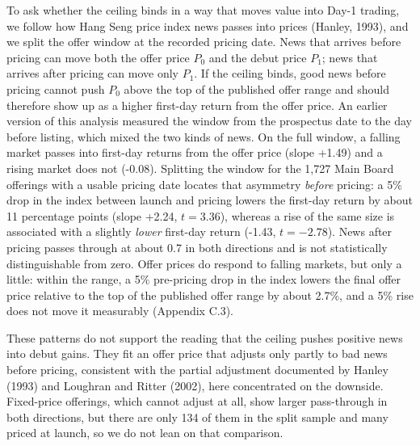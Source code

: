 \documentclass[11pt,letterpaper]{article}
\begin{document}
To ask whether the ceiling binds in a way that moves value into Day-1 trading, we follow how Hang Seng price index news passes into prices (Hanley, 1993), and we split the offer window at the recorded pricing date. News that arrives before pricing can move both the offer price $P_0$ and the debut price $P_1$; news that arrives after pricing can move only $P_1$. If the ceiling binds, good news before pricing cannot push $P_0$ above the top of the published offer range and should therefore show up as a higher first-day return from the offer price. An earlier version of this analysis measured the window from the prospectus date to the day before listing, which mixed the two kinds of news. On the full window, a falling market passes into first-day returns from the offer price (slope +1.49) and a rising market does not (-0.08). Splitting the window for the 1,727 Main Board offerings with a usable pricing date locates that asymmetry \textit{before} pricing: a 5\% drop in the index between launch and pricing lowers the first-day return by about 11 percentage points (slope +2.24, $t = 3.36$), whereas a rise of the same size is associated with a slightly \textit{lower} first-day return (-1.43, $t = -2.78$). News after pricing passes through at about 0.7 in both directions and is not statistically distinguishable from zero. Offer prices do respond to falling markets, but only a little: within the range, a 5\% pre-pricing drop in the index lowers the final offer price relative to the top of the published offer range by about 2.7\%, and a 5\% rise does not move it measurably (Appendix C.3).

These patterns do not support the reading that the ceiling pushes positive news into debut gains. They fit an offer price that adjusts only partly to bad news before pricing, consistent with the partial adjustment documented by Hanley (1993) and Loughran and Ritter (2002), here concentrated on the downside. Fixed-price offerings, which cannot adjust at all, show larger pass-through in both directions, but there are only 134 of them in the split sample and many priced at launch, so we do not lean on that comparison.
\end{document}
